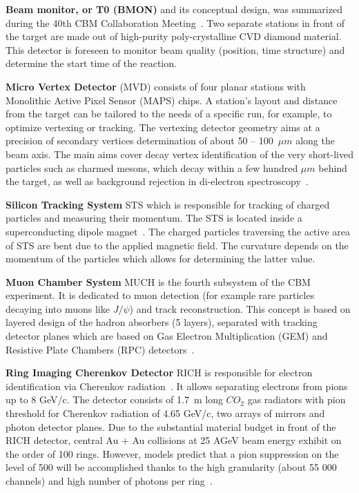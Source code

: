 \textbf{Beam monitor, or T0 (\gls{BMON})} and its conceptual design, was summarized during the 40th \gls{CBM} Collaboration Meeting~\cite{bmon}. Two separate stations in front of the target are made out of high-purity poly-crystalline CVD diamond material. This detector is foreseen to monitor beam quality (position, time structure) and determine the start time of the reaction.\bigbreak

\textbf{Micro Vertex Detector} (\gls{MVD}) consists of four planar stations with Monolithic Active Pixel Sensor (\gls{MAPS}) chips. A station's layout and distance from the target can be tailored to the needs of a specific run, for example, to optimize vertexing or tracking. The vertexing detector geometry aims at a precision of secondary vertices determination of about 50 -- 100~$\mu m$ along the beam axis. The main aims cover decay vertex identification of the very short-lived particles such as charmed mesons, which decay within a few hundred $\mu m$ behind the target, as well as background rejection in di-electron spectroscopy~\cite{MVD}.\bigbreak

 \textbf{Silicon Tracking System} \gls{STS} which is responsible for tracking of charged particles and measuring their momentum. The \gls{STS} is located inside a superconducting dipole magnet~\cite{Malakhov:109025}. The charged particles traversing the active area of \gls{STS} are bent due to the applied magnetic field. The curvature depends on the momentum of the particles which allows for determining the latter value.\bigbreak
 
\textbf{Muon Chamber System} \gls{MUCH} is the fourth subsystem of the \gls{CBM} experiment. It is dedicated to muon detection (for example rare particles decaying into muons like $J/\psi$) and track reconstruction. This concept is based on layered design of the hadron absorbers (5 layers), separated with tracking detector planes which are based on Gas Electron Multiplication (\gls{GEM}) and Resistive Plate Chambers (\gls{RPC}) detectors~\cite{MUCH}.\bigbreak

\textbf{Ring Imaging Cherenkov Detector} \gls{RICH} is responsible for electron identification via Cherenkov radiation~\cite{RICH}. It allows separating electrons from pions up to 8 GeV/c. The detector consists of \SI{1.7}{\metre} long $CO_{2}$ gas radiators with pion threshold for Cherenkov radiation of 4.65 GeV/c, two arrays of mirrors and photon detector planes. Due to the substantial material budget in front of the RICH detector, central Au + Au collisions at 25 AGeV beam energy exhibit on the order of 100 rings. However, models predict that a pion suppression on the level of 500 will be accomplished thanks to the high granularity (about 55 000 channels) and high number of photons per ring~\cite{RICH}.\bigbreak

